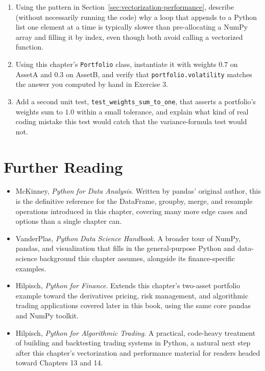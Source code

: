 \documentclass[../ai_in_finance]{subfiles}
\begin{document}
\begin{enumerate}
    \item Using the pattern in Section~\ref{sec:vectorization-performance}, describe (without necessarily running the code) why a loop that appends to a Python list one element at a time is typically slower than pre-allocating a NumPy array and filling it by index, even though both avoid calling a vectorized function.
    \item Using this chapter's \texttt{Portfolio} class, instantiate it with weights $0.7$ on AssetA and $0.3$ on AssetB, and verify that \texttt{portfolio.volatility} matches the answer you computed by hand in Exercise 3.
    \item Add a second unit test, \texttt{test\_weights\_sum\_to\_one}, that asserts a portfolio's weights sum to $1.0$ within a small tolerance, and explain what kind of real coding mistake this test would catch that the variance-formula test would not.
\end{enumerate}

\section{Further Reading}

\begin{itemize}
    \item McKinney, \emph{Python for Data Analysis}. Written by pandas' original author, this is the definitive reference for the DataFrame, groupby, merge, and resample operations introduced in this chapter, covering many more edge cases and options than a single chapter can.
    \item VanderPlas, \emph{Python Data Science Handbook}. A broader tour of NumPy, pandas, and visualization that fills in the general-purpose Python and data-science background this chapter assumes, alongside its finance-specific examples.
    \item Hilpisch, \emph{Python for Finance}. Extends this chapter's two-asset portfolio example toward the derivatives pricing, risk management, and algorithmic trading applications covered later in this book, using the same core pandas and NumPy toolkit.
    \item Hilpisch, \emph{Python for Algorithmic Trading}. A practical, code-heavy treatment of building and backtesting trading systems in Python, a natural next step after this chapter's vectorization and performance material for readers headed toward Chapters 13 and 14.
\end{itemize}
\end{document}
